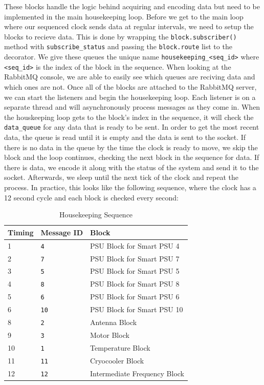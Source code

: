 These blocks handle the logic behind acquiring and encoding data but need to be implemented in the main housekeeping loop.
Before we get to the main loop where our sequenced clock sends data at regular intervals, we need to setup the blocks to recieve data. 
This is done by wrapping the \texttt{block.subscriber()} method with \texttt{subscribe\_status} and passing the \texttt{block.route} list to the decorator.
We give these queues the unique name \texttt{housekeeping\_<seq\_id>} where \texttt{<seq\_id>} is the index of the block in the sequence.
When looking at the RabbitMQ console, we are able to easily see which queues are reciving data and which ones are not.
Once all of the blocks are attached to the RabbitMQ server, we can start the listeners and begin the housekeeping loop.
Each listener is on a separate thread and will asynchronously process messages as they come in.
When the houskeeping loop gets to the block's index in the sequence, it will check the \texttt{data\_queue} for any data that is ready to be sent.
In order to get the most recent data, the queue is read until it is empty and the data is sent to the socket.
If there is no data in the queue by the time the clock is ready to move, we skip the block and the loop continues, checking the next block in the sequence for data. 
If there is data, we encode it along with the status of the system and send it to the socket.
Afterwards, we sleep until the next tick of the clock and repeat the process.
In practice, this looks like the following sequence, where the clock has a 12 second cycle and each block is checked every second:
\begin{table}
    \centering
    \begin{tabularx}{\textwidth}{l|l|X}
        \textbf{Timing} & \textbf{Message ID} & \textbf{Block} \\
        \hline
        1 &\texttt{4} & PSU Block for Smart PSU 4 \\
        2 &\texttt{7} & PSU Block for Smart PSU 7 \\
        3 &\texttt{5} & PSU Block for Smart PSU 5 \\
        4 &\texttt{8} & PSU Block for Smart PSU 8 \\
        5 &\texttt{6} & PSU Block for Smart PSU 6 \\
        6 &\texttt{10} & PSU Block for Smart PSU 10 \\
        8 &\texttt{2} & Antenna Block \\
        9 & \texttt{3} & Motor Block \\
        10 & \texttt{1} & Temperature Block \\
        11 & \texttt{11} & Cryocooler Block \\
        12 & \texttt{12} & Intermediate Frequency Block \\
    \end{tabularx}
    \label{chap2/table:housekeeping_sequence}
    \caption{Housekeeping Sequence}
\end{table}

